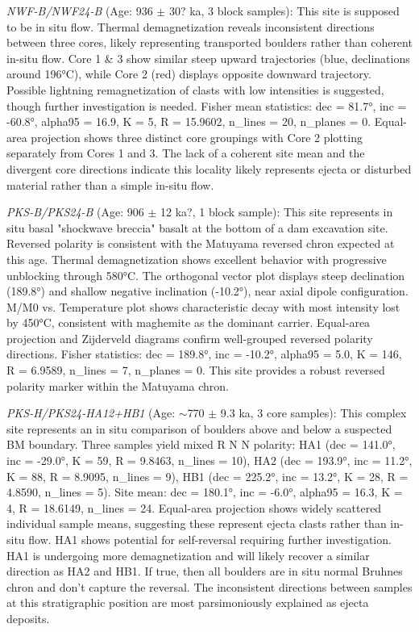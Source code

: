 \documentclass[twocolumn,11pt]{article}
\begin{document}
\textit{NWF-B/NWF24-B} (Age: 936 $\pm$ 30? ka, 3 block samples): This site is supposed to be in situ flow. Thermal demagnetization reveals inconsistent directions between three cores, likely representing transported boulders rather than coherent in-situ flow. Core 1 \& 3 show similar steep upward trajectories (blue, declinations around 196°C), while Core 2 (red) displays opposite downward trajectory. Possible lightning remagnetization of clasts with low intensities is suggested, though further investigation is needed. Fisher mean statistics: dec = 81.7°, inc = -60.8°, alpha95 = 16.9, K = 5, R = 15.9602, n\_lines = 20, n\_planes = 0. Equal-area projection shows three distinct core groupings with Core 2 plotting separately from Cores 1 and 3. The lack of a coherent site mean and the divergent core directions indicate this locality likely represents ejecta or disturbed material rather than a simple in-situ flow.

\textit{PKS-B/PKS24-B} (Age: 906 $\pm$ 12 ka?, 1 block sample): This site represents in situ basal "shockwave breccia" basalt at the bottom of a dam excavation site. Reversed polarity is consistent with the Matuyama reversed chron expected at this age. Thermal demagnetization shows excellent behavior with progressive unblocking through 580°C. The orthogonal vector plot displays steep declination (189.8°) and shallow negative inclination (-10.2°), near axial dipole configuration. M/M0 vs. Temperature plot shows characteristic decay with most intensity lost by 450°C, consistent with maghemite as the dominant carrier. Equal-area projection and Zijderveld diagrams confirm well-grouped reversed polarity directions. Fisher statistics: dec = 189.8°, inc = -10.2°, alpha95 = 5.0, K = 146, R = 6.9589, n\_lines = 7, n\_planes = 0. This site provides a robust reversed polarity marker within the Matuyama chron.

\textit{PKS-H/PKS24-HA12+HB1} (Age: $\sim$770 $\pm$ 9.3 ka, 3 core samples): This complex site represents an in situ comparison of boulders above and below a suspected BM boundary. Three samples yield mixed R N N polarity: HA1 (dec = 141.0°, inc = -29.0°, K = 59, R = 9.8463, n\_lines = 10), HA2 (dec = 193.9°, inc = 11.2°, K = 88, R = 8.9095, n\_lines = 9), HB1 (dec = 225.2°, inc = 13.2°, K = 28, R = 4.8590, n\_lines = 5). Site mean: dec = 180.1°, inc = -6.0°, alpha95 = 16.3, K = 4, R = 18.6149, n\_lines = 24. Equal-area projection shows widely scattered individual sample means, suggesting these represent ejecta clasts rather than in-situ flow. HA1 shows potential for self-reversal requiring further investigation. HA1 is undergoing more demagnetization and will likely recover a similar direction as HA2 and HB1. If true, then all boulders are in situ normal Bruhnes chron and don't capture the reversal. The inconsistent directions between samples at this stratigraphic position are most parsimoniously explained as ejecta deposits.
\end{document}
